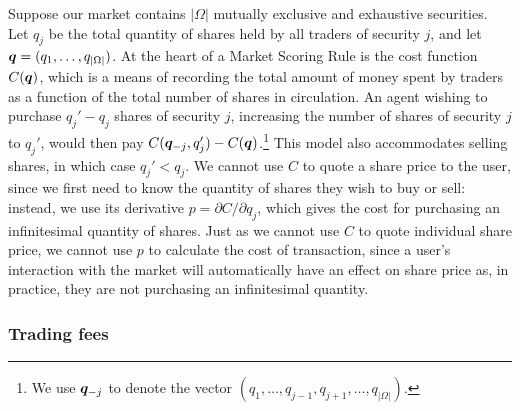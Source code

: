 Suppose our market contains $|\Omega|$ mutually exclusive and exhaustive
securities. Let $q_j$ be the total quantity of shares held by all traders of
security $j$, and let $\bm{q} = (q_1, \ldots, q_{|\Omega|})$. At the heart of
a Market Scoring Rule is the cost function $C(\bm{q})$, which is a means of
recording the total amount of money spent by traders as a function of the total
number of shares in circulation. An agent wishing to purchase $q_j' - q_j$
shares of security $j$, increasing the number of shares of security $j$ to
$q_j'$, would then pay $C(\bm{q}_{-j}, q_j') - C(\bm{q})$.\footnote{We use
$\bm{q}_{-j}$ to denote the vector $(q_1, \ldots, q_{j-1}, q_{j+1}, \ldots,
q_{|\Omega|})$.} This model also accommodates selling shares, in which case
$q_j' < q_j$. We cannot use $C$ to quote a share price to the user, since we
first need to know the quantity of shares they wish to buy or sell: instead, we
use its derivative $p = \partial C / \partial q_j$, which gives the cost for
purchasing an infinitesimal quantity of shares. Just as we cannot use $C$ to
quote individual share price, we cannot use $p$ to calculate the cost of
transaction, since a user's interaction with the market will automatically have
an effect on share price as, in practice, they are not purchasing an
infinitesimal quantity.

\subsubsection{Trading fees}

